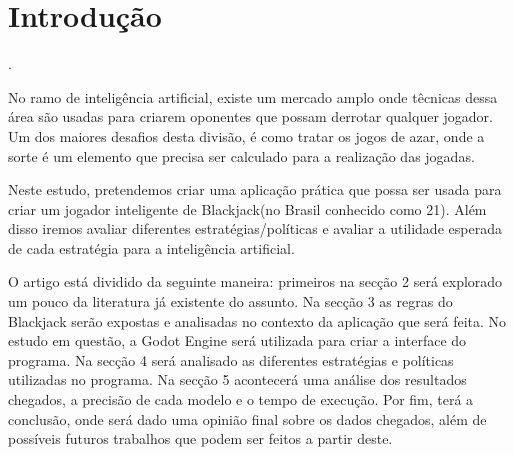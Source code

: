 \section{Introdução}


    \cite{Sibgrapi2021}.

    No ramo de inteligência artificial, existe um mercado amplo onde 
    têcnicas dessa área são usadas para criarem oponentes que possam
    derrotar qualquer jogador. Um dos maiores desafios desta divisão,
    é como tratar os jogos de azar, onde a sorte é um elemento que 
    precisa ser calculado para a realização das jogadas.

    Neste estudo, pretendemos criar uma aplicação prática que 
    possa ser usada para criar um jogador inteligente de Blackjack(no 
    Brasil conhecido como 21). Além disso iremos avaliar diferentes 
    estratégias/políticas e avaliar a utilidade esperada de cada estratégia 
    para a inteligência artificial.

    O artigo está dividido da seguinte maneira: primeiros na secção 2 
    será explorado um pouco da literatura já existente do assunto. Na secção 
    3 as regras do Blackjack serão expostas e analisadas no contexto da aplicação 
    que será feita. No estudo em questão, a Godot Engine será utilizada para 
    criar a interface do programa. Na secção 4 será analisado as diferentes 
    estratégias e políticas utilizadas no programa. Na secção 5 acontecerá uma análise 
    dos resultados chegados, a precisão de cada modelo e o tempo de execução. Por fim, 
    terá a conclusão, onde será dado uma opinião final sobre os dados chegados, além de possíveis 
    futuros trabalhos que podem ser feitos a partir deste.